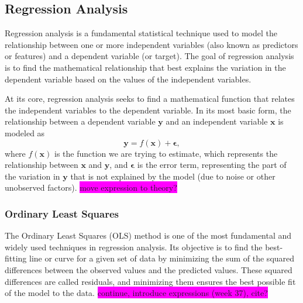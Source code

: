 \documentclass[aps,pra,english,notitlepage,reprint,nofootinbib]{revtex4-1}  %
\begin{document}

\subsection{Regression Analysis}
Regression analysis is a fundamental statistical technique used to model the relationship between one or more independent variables (also known as predictors or features) and a dependent variable (or target). The goal of regression analysis is to find the mathematical relationship that best explains the variation in the dependent variable based on the values of the independent variables.

At its core, regression analysis seeks to find a mathematical function that relates the independent variables to the dependent variable. In its most basic form, the relationship between a dependent variable $\mathbf{y}$ and an independent variable $\mathbf{x}$ is modeled as
\begin{equation}
  \mathbf{y} = f(\mathbf{x}) + \boldsymbol{\epsilon},
\end{equation}
where $f(\mathbf{x})$ is the function we are trying to estimate, which represents the relationship between $\mathbf{x}$ and $\mathbf{y}$, and $\boldsymbol{\epsilon}$ is the error term, representing the part of the variation in $\mathbf{y}$ that is not explained by the model (due to noise or other unobserved factors). 
\colorbox{magenta}{move expression to theory?}

\subsubsection{Ordinary Least Squares}\label{subsubsec:ols}
The Ordinary Least Squares (OLS) method is one of the most fundamental and widely used techniques in regression analysis. Its objective is to find the best-fitting line or curve for a given set of data by minimizing the sum of the squared differences between the observed values and the predicted values. These squared differences are called residuals, and minimizing them ensures the best possible fit of the model to the data. \colorbox{magenta}{continue, introduce expressions (week 37), cite?}
\end{document}

